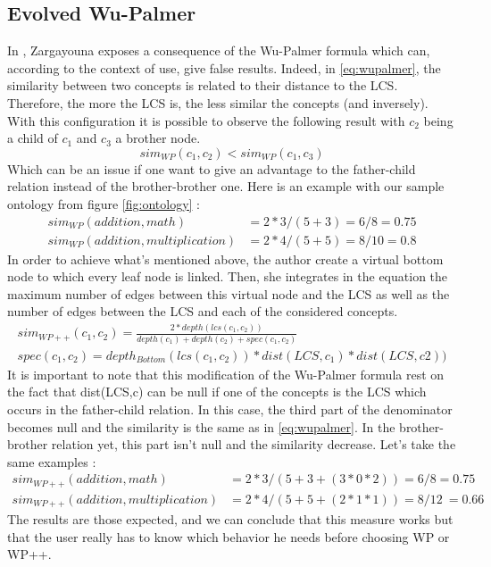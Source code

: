 \subsection{Evolved Wu-Palmer} %
\label{ssub:evolved_wu_palmer}
In \cite{zargayouna2004mesure}, Zargayouna exposes a consequence of the Wu-Palmer formula which can, according to the context of use, give false results. Indeed, in \eqref{eq:wupalmer}, the similarity between two concepts is related to their distance to the LCS. Therefore, the more  the LCS is, the less similar the concepts (and inversely). With this configuration it is possible to observe the following result with $c_2$ being a child of $c_1$ and $c_3$ a brother node.
\begin{equation}
\label{eq:pbWPpp}
sim_{WP}(c_1, c_2) < sim_{WP}(c_1, c_3)
\end{equation}
Which can be an issue if one want to give an advantage to the father-child relation instead of the brother-brother one. Here is an example with our sample ontology from figure \ref{fig:ontology} :
\begin{align}
\label{eq:obsWPp}
sim_{WP}(addition, math)& = 2*3 / (5 + 3) = 6/8 = 0.75\\
sim_{WP}(addition, multiplication)& = 2*4 / (5 + 5) = 8/10 = 0.8
\end{align}
In order to achieve what's mentioned above, the author create a virtual bottom node to which every leaf node is linked. Then, she integrates in the equation the maximum number of edges between this virtual node and the LCS as well as the number of edges between the LCS and each of the considered concepts. 
\begin{align}
\label{eq:WPpp}
sim_{WP++}(c_1, c_2) = \frac{2*depth(lcs(c_1,c_2))}{depth(c_1) + depth(c_2) + spec(c_1,c_2)}\\
spec(c_1,c_2) = depth_{Bottom}(lcs(c_1,c_2))*dist(LCS, c_1)*dist(LCS,c2))
\end{align}
It is important to note that this modification of the Wu-Palmer formula rest on the fact that dist(LCS,c) can be null if one of the concepts is the LCS which occurs in the father-child relation. In this case, the third part of the denominator becomes null and the similarity is the same as in \eqref{eq:wupalmer}. In the brother-brother relation yet, this part isn't null and the similarity decrease. Let's take the same examples :
\begin{align}
\label{eq:resultWPp}
sim_{WP++}(addition, math)& = 2*3 / (5 + 3 + (3*0*2)) = 6/8 = 0.75\\
sim_{WP++}(addition, multiplication)& = 2*4 / (5 + 5 + (2*1*1)) = 8/12 ~= 0.66 
\end{align}
The results are those expected, and we can conclude that this measure works but that the user really has to know which behavior he needs before choosing WP or WP++.


